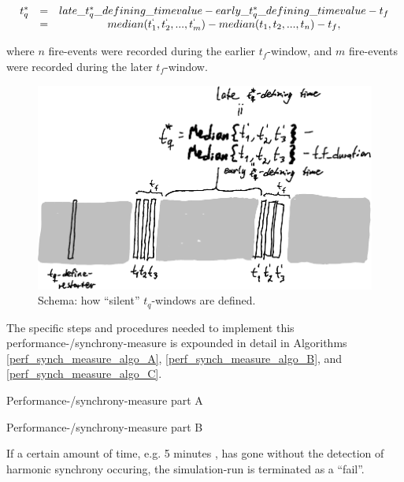 		\begin{equation}
		\label{t_q_definition}
		\begin{array}{rrclcl}
		t_q^* & = & late\_t_q^*\_defining\_timevalue - early\_t_q^*\_defining\_timevalue - t_f \\
		& = & median(t_1^`, t_2^`, ..., t_m^`) - median(t_1, t_2, ..., t_n) - t_f , \\
		\end{array}
		\end{equation}

		where $n$ fire-events were recorded during the earlier $t_f$-window, and $m$ fire-events were recorded during the later $t_f$-window.


		\begin{figure}[ht!]
			\centering
			\includegraphics[width=0.85\linewidth]{Assets/Figures/Illustrations/t_q_schema.pdf}
			\caption{Schema: how ``silent'' $t_q$-windows are defined. }
			\label{fig:t_q_schema}
		\end{figure}


		The specific steps and procedures needed to implement this performance-/synchrony-measure is expounded in detail in Algorithms \ref{perf_synch_measure_algo_A}, \ref{perf_synch_measure_algo_B}, and \ref{perf_synch_measure_algo_C}.

		\begin{algorithm}
		\caption{Performance-/synchrony-measure part A }\label{perf_synch_measure_algo_A}
		\end{algorithm}

		\begin{algorithm}
		\caption{Performance-/synchrony-measure part B }\label{perf_synch_measure_algo_B}
		\end{algorithm}

		If a certain amount of time, e.g. 5 minutes \cite{nymoen_synch}, has gone without the detection of harmonic synchrony occuring, the simulation-run is terminated as a ``fail''.
	
	
		
	
